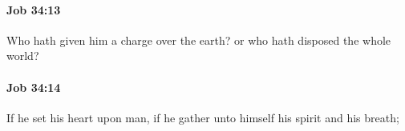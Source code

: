 		\paragraph{Job 34:13} %
			\label{JOB-34-13}

			Who hath given him a charge over the earth? or who hath disposed the whole world?


		\paragraph{Job 34:14} %
			\label{JOB-34-14}

			If he set his heart upon man, if he gather unto himself his spirit and his breath;


